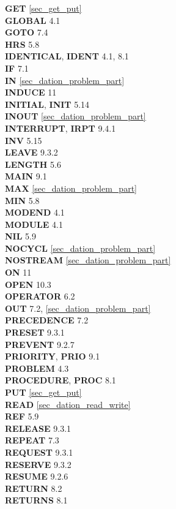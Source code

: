 {{\bf GET} \ref{sec_get_put}\\
{\bf GLOBAL} 4.1\\
{\bf GOTO} 7.4\\
 
{\bf HRS} 5.8\\
 
{\bf IDENTICAL}, {\bf IDENT} 4.1, 8.1\\
{\bf IF} 7.1\\                           
{\bf IN} \ref{sec_dation_problem_part}\\
{\bf INDUCE} 11\\
{\bf INITIAL}, {\bf INIT} 5.14\\
{\bf INOUT} \ref{sec_dation_problem_part}\\
{\bf INTERRUPT}, {\bf IRPT} 9.4.1\\
{\bf INV} 5.15\\
 
{\bf LEAVE} 9.3.2\\
{\bf LENGTH} 5.6\\
 
{\bf MAIN} 9.1\\
{\bf MAX} \ref{sec_dation_problem_part}\\
{\bf MIN} 5.8\\
{\bf MODEND} 4.1\\
{\bf MODULE} 4.1\\
 
{\bf NIL} 5.9\\
{\bf NOCYCL} \ref{sec_dation_problem_part}\\
{\bf NOSTREAM} \ref{sec_dation_problem_part}\\

{\bf ON} 11\\
{\bf OPEN} 10.3\\
{\bf OPERATOR} 6.2\\
{\bf OUT} 7.2, \ref{sec_dation_problem_part}\\
 
{\bf PRECEDENCE} 7.2\\
{\bf PRESET} 9.3.1\\
{\bf PREVENT} 9.2.7\\
{\bf PRIORITY}, {\bf PRIO} 9.1\\
{\bf PROBLEM} 4.3\\
{\bf PROCEDURE}, {\bf PROC} 8.1\\
{\bf PUT} \ref{sec_get_put}\\

{\bf READ} \ref{sec_dation_read_write}\\
{\bf REF} 5.9\\
{\bf RELEASE} 9.3.1\\
{\bf REPEAT} 7.3\\
{\bf REQUEST} 9.3.1\\
{\bf RESERVE} 9.3.2\\
{\bf RESUME} 9.2.6\\
{\bf RETURN} 8.2\\
{\bf RETURNS} 8.1\\
 
}
